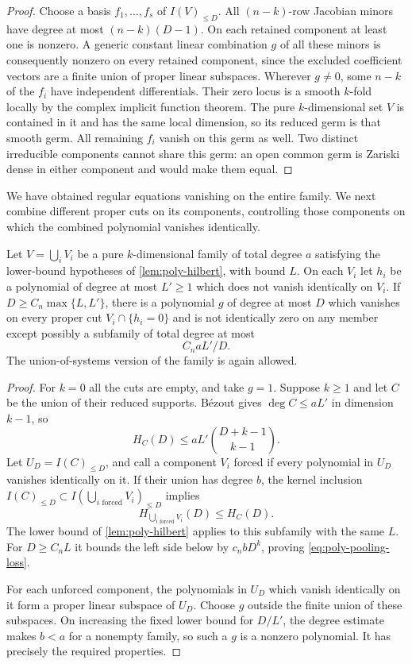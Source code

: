 \begin{proof}
Choose a basis $f_1,\ldots,f_s$ of $I(V)_{\le D}$.  All $(n-k)$-row Jacobian minors have degree at most $(n-k)(D-1)$. On each retained component at least one is nonzero.  A generic constant linear combination $g$ of all these minors is consequently nonzero on every retained component, since the excluded coefficient vectors are a finite union of proper linear subspaces.  Wherever $g\ne0$, some $n-k$ of the $f_i$ have independent differentials. Their zero locus is a smooth $k$-fold locally by the complex implicit function theorem.  The pure $k$-dimensional set $V$ is contained in it and has the same local dimension, so its reduced germ is that smooth germ.  All remaining $f_i$ vanish on this germ as well.  Two distinct irreducible components cannot share this germ: an open common germ is Zariski dense in either component and would make them equal.
\end{proof}

We have obtained regular equations vanishing on the entire family. We next combine different proper cuts on its components, controlling those components on which the combined polynomial vanishes identically.

\begin{lemma}\label{lem:poly-pooling}
Let $V=\bigcup_iV_i$ be a pure $k$-dimensional family of total degree $a$ satisfying the lower-bound hypotheses of \cref{lem:poly-hilbert}, with bound $L$.  On each $V_i$ let $h_i$ be a polynomial of degree at most $L'\ge1$ which does not vanish identically on $V_i$.  If $D\ge C_n\max\{L,L'\}$, there is a polynomial $g$ of degree at most $D$ which vanishes on every proper cut $V_i\cap\{h_i=0\}$ and is not identically zero on any member except possibly a subfamily of total degree at most
\begin{equation}\label{eq:poly-pooling-loss}
 C_n aL'/D.
\end{equation}
The union-of-systems version of the family is again allowed.
\end{lemma}

\begin{proof}
For $k=0$ all the cuts are empty, and take $g=1$.  Suppose $k\ge1$ and let $C$ be the union of their reduced supports.  B\'ezout gives $\deg C\le aL'$ in dimension $k-1$, so
\[
 H_C(D)\le aL'\binom{D+k-1}{k-1}.
\]
Let $U_D=I(C)_{\le D}$, and call a component $V_i$ forced if every polynomial in $U_D$ vanishes identically on it.  If their union has degree $b$, the kernel inclusion $I(C)_{\le D}\subset I(\bigcup_{i\text{ forced}}V_i)_{\le D}$ implies
\[
 H_{\bigcup_{i\text{ forced}}V_i}(D)\le H_C(D).
\]
The lower bound of \cref{lem:poly-hilbert} applies to this subfamily with the same $L$.  For $D\ge C_nL$ it bounds the left side below by $c_n bD^k$, proving \eqref{eq:poly-pooling-loss}.

For each unforced component, the polynomials in $U_D$ which vanish identically on it form a proper linear subspace of $U_D$.  Choose $g$ outside the finite union of these subspaces.  On increasing the fixed lower bound for $D/L'$, the degree estimate makes $b<a$ for a nonempty family, so such a $g$ is a nonzero polynomial. It has precisely the required properties.
\end{proof}

